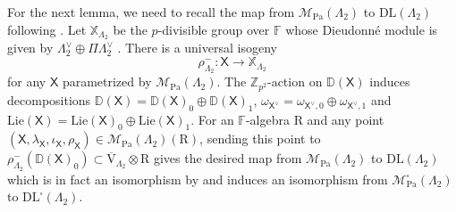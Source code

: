 \documentclass[10pt]{amsart}
\numberwithin{equation}{section}
\theoremstyle{definition}
\def\Pa{\mathrm{Pa}}
\def\calM{\mathcal{M}}
\def\DD{\mathbb{D}}
\def\FF{\mathbb{F}}
\def\XX{\mathbb{X}}
\def\sfX{\mathsf{X}}
\def\ZZ{\mathbb{Z}}
\def\rmV{\mathrm{V}}
\def\rmR{\mathrm{R}}
\begin{document}
For the next lemma, we need to recall the map from $\calM_{\Pa}(\Lambda_{2})$ to $\mathrm{DL}(\Lambda_{2})$ following \cite[\S 4]{Wanga}. Let $\XX_{\Lambda_{2}}$ be the $p$-divisible group over $\FF$ whose Dieudonn\'{e}  module is given by $\Lambda^{\vee}_{2}\oplus \Pi\Lambda^{\vee}_{2}$ \cite[Lemma 4.7]{Wanga}. There is a universal isogeny
\begin{equation}
\rho^{-}_{\Lambda_{2}}:\sfX\rightarrow\XX_{\Lambda_{2}}
\end{equation}
for any $\sfX$ parametrized by $\calM_{\Pa}(\Lambda_{2})$. The $\ZZ_{p^{2}}$-action on $\DD(\sfX)$ induces decompositions $\DD(\sfX)=\DD(\sfX)_{0}\oplus \DD(\sfX)_{1}$, $\omega_{\sfX^{\vee}}=\omega_{\sfX^{\vee},0}\oplus \omega_{\sfX^{\vee},1}$ and $\mathrm{Lie}(\sfX)=\mathrm{Lie}(\sfX)_{0}\oplus \mathrm{Lie}(\sfX)_{1}$. For an $\FF$-algebra $\rmR$ and any point $(\sfX, \lambda_{\sfX}, \iota_{\sfX}, \rho_{\sfX} )\in\calM_{\Pa}(\Lambda_{2})(\rmR)$, sending this point to $\rho^{-}_{\Lambda_{2}}(\DD(\sfX)_{0})\subset \overline{\rmV}_{\Lambda_{2}}\otimes\rmR$ gives the desired map from $\calM_{\Pa}(\Lambda_{2})$ to $\mathrm{DL}(\Lambda_{2})$ which is in fact an isomorphism by \cite[Proposition 4.12]{Wanga} and induces an isomorphism from $\calM^{\square}_{\Pa}(\Lambda_{2})$ to $\mathrm{DL}^{\square}(\Lambda_{2})$. 
\end{document}
